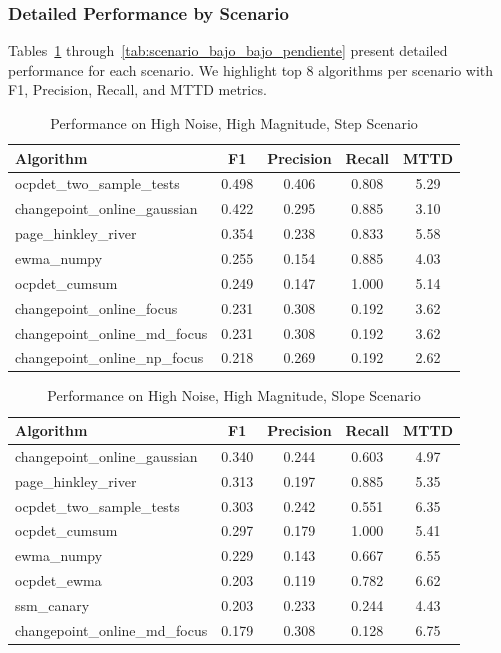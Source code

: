 \documentclass[journal,article,submit,pdftex,moreauthors]{Definitions/mdpi}
\begin{document}
\subsubsection{Detailed Performance by Scenario}

Tables~\ref{tab:scenario_alto_alto_escalon} through~\ref{tab:scenario_bajo_bajo_pendiente} present detailed performance for each scenario. We highlight top 8 algorithms per scenario with F1, Precision, Recall, and MTTD metrics.

\begin{table}[ht]
\centering
\caption{Performance on High Noise, High Magnitude, Step Scenario}
\label{tab:scenario_alto_alto_escalon}
\small
\begin{tabular}{lcccc}
\toprule
\textbf{Algorithm} & \textbf{F1} & \textbf{Precision} & \textbf{Recall} & \textbf{MTTD} \\
\midrule
ocpdet\_two\_sample\_tests & 0.498 & 0.406 & 0.808 & 5.29 \\
changepoint\_online\_gaussian & 0.422 & 0.295 & 0.885 & 3.10 \\
page\_hinkley\_river & 0.354 & 0.238 & 0.833 & 5.58 \\
ewma\_numpy & 0.255 & 0.154 & 0.885 & 4.03 \\
ocpdet\_cumsum & 0.249 & 0.147 & 1.000 & 5.14 \\
changepoint\_online\_focus & 0.231 & 0.308 & 0.192 & 3.62 \\
changepoint\_online\_md\_focus & 0.231 & 0.308 & 0.192 & 3.62 \\
changepoint\_online\_np\_focus & 0.218 & 0.269 & 0.192 & 2.62 \\
\bottomrule
\end{tabular}
\end{table}

\clearpage

\begin{table}[ht]
\centering
\caption{Performance on High Noise, High Magnitude, Slope Scenario}
\label{tab:scenario_alto_alto_pendiente}
\small
\begin{tabular}{lcccc}
\toprule
\textbf{Algorithm} & \textbf{F1} & \textbf{Precision} & \textbf{Recall} & \textbf{MTTD} \\
\midrule
changepoint\_online\_gaussian & 0.340 & 0.244 & 0.603 & 4.97 \\
page\_hinkley\_river & 0.313 & 0.197 & 0.885 & 5.35 \\
ocpdet\_two\_sample\_tests & 0.303 & 0.242 & 0.551 & 6.35 \\
ocpdet\_cumsum & 0.297 & 0.179 & 1.000 & 5.41 \\
ewma\_numpy & 0.229 & 0.143 & 0.667 & 6.55 \\
ocpdet\_ewma & 0.203 & 0.119 & 0.782 & 6.62 \\
ssm\_canary & 0.203 & 0.233 & 0.244 & 4.43 \\
changepoint\_online\_md\_focus & 0.179 & 0.308 & 0.128 & 6.75 \\
\bottomrule
\end{tabular}
\end{table}
\end{document}
